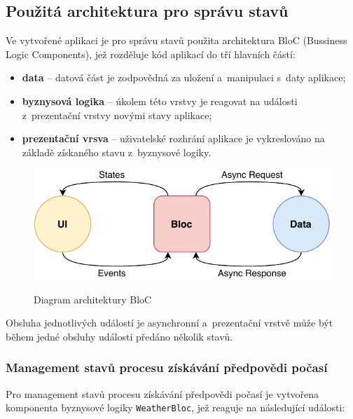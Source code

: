 \documentclass[12pt, a4paper]{article}
\begin{document}
\subsection{Použitá architektura pro správu stavů}

Ve vytvořené aplikaci je pro správu stavů použita architektura BloC (Bussiness Logic Components), jež rozděluje kód aplikací do tří hlavních částí: 
\begin{itemize}
        \item \textbf{data} -- datová část je zodpovědná za uložení a~manipulaci s~daty aplikace;
        \item \textbf{byznysová logika} -- úkolem této vrstvy je reagovat na události z~prezentační vrstvy novými stavy aplikace;
        \item \textbf{prezentační vrsva} -- uživatelské rozhrání aplikace je vykreslováno na základě získaného stavu z~byznysové logiky.
\end{itemize}

\begin{figure}[!ht]
\centering
{\includegraphics[width=13.5cm]{pdf/bloc-diagram.pdf}}
\caption{Diagram architektury BloC}
\label{fig:vrp-recognition-diagram}
\end{figure}

Obsluha jednotlivých událostí je asynchronní a~prezentační vrstvě může být během jedné obsluhy události předáno několik stavů.


\subsubsection{Management stavů procesu získávání předpovědi počasí}

Pro management stavů procesu získávání předpovědi počasí je vytvořena komponenta byznysové logiky \texttt{WeatherBloc}, jež reaguje na následující události:
\end{document}
